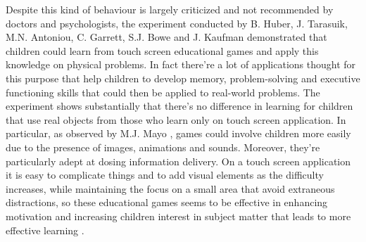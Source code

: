 Despite this kind of behaviour is largely criticized and not recommended by doctors and psychologists, the experiment conducted by B. Huber, J. Tarasuik, M.N. Antoniou, C. Garrett, S.J. Bowe and J. Kaufman \cite{Huber} demonstrated that children could learn from touch screen educational games and apply this knowledge on physical problems. In fact there're a lot of applications thought for this purpose that help children to develop memory, problem-solving and executive functioning skills that could then be applied to real-world problems. The experiment shows substantially that there's no difference in learning for children that use real objects from those who learn only on touch screen application. In particular, as observed by M.J. Mayo \cite{Mayo}, games could involve children more easily due to the presence of images, animations and sounds. Moreover, they're particularly adept at dosing information delivery. On a touch screen application it is easy to complicate things and to add visual elements as the difficulty increases, while maintaining the focus on a small area that avoid extraneous distractions, so these educational games seems to be effective in enhancing motivation and increasing children interest in subject matter that leads to more effective learning \cite{Annetta}. 


